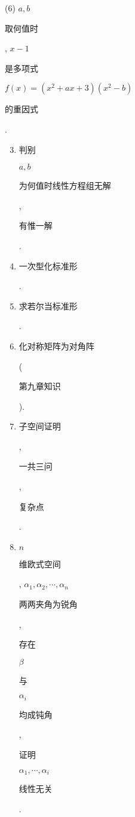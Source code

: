\documentclass[10pt]{article}
\begin{document}
(6) $a, b$ \begin{CJK}{UTF8}{mj}取何值时\end{CJK}, $x-1$ \begin{CJK}{UTF8}{mj}是多项式\end{CJK} $f(x)=\left(x^{2}+a x+3\right)\left(x^{2}-b\right)$ \begin{CJK}{UTF8}{mj}的重因式\end{CJK}.

\begin{enumerate}
  \setcounter{enumi}{2}
  \item \begin{CJK}{UTF8}{mj}判别\end{CJK} $a, b$ \begin{CJK}{UTF8}{mj}为何值时线性方程组无解\end{CJK}, \begin{CJK}{UTF8}{mj}有惟一解\end{CJK}.

  \item \begin{CJK}{UTF8}{mj}一次型化标准形\end{CJK}.

  \item \begin{CJK}{UTF8}{mj}求若尔当标准形\end{CJK}.

  \item \begin{CJK}{UTF8}{mj}化对称矩阵为对角阵\end{CJK} (\begin{CJK}{UTF8}{mj}第九章知识\end{CJK}).

  \item \begin{CJK}{UTF8}{mj}子空间证明\end{CJK},\begin{CJK}{UTF8}{mj}一共三问\end{CJK}, \begin{CJK}{UTF8}{mj}复杂点\end{CJK}.

  \item $n$ \begin{CJK}{UTF8}{mj}维欧式空间\end{CJK}, $\alpha_{1}, \alpha_{2}, \cdots, \alpha_{n}$ \begin{CJK}{UTF8}{mj}两两夹角为锐角\end{CJK}, \begin{CJK}{UTF8}{mj}存在\end{CJK} $\beta$ \begin{CJK}{UTF8}{mj}与\end{CJK} $\alpha_{i}$ \begin{CJK}{UTF8}{mj}均成钝角\end{CJK}, \begin{CJK}{UTF8}{mj}证明\end{CJK} $\alpha_{1}, \cdots, \alpha_{i}$ \begin{CJK}{UTF8}{mj}线性无关\end{CJK}.


\end{enumerate}
\end{document}
